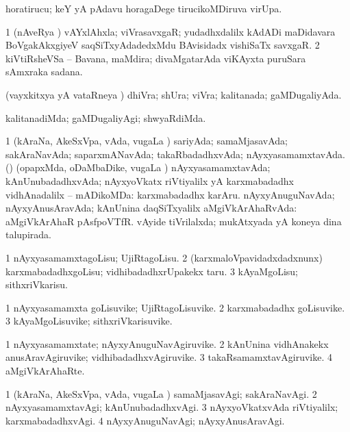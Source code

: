 \bentry
{} 
\gl{\nA}
\expl{}
\bmng
 horatirucu; keY yA pAdavu horagaDege tirucikoMDiruva virUpa. 
\emng
\eentry

\bentry
{} 
\gl{\nA}
\expl{}
\bmng
\bnum
\num{1} (nAveRya \pu) vAYxlAhxla; viVrasavxgaR; yudadhxdalilx kAdADi maDidavara BoVgakAkxgiyeV saqSiTxyAdadedxMdu BAvisidadx vishiSaTx savxgaR. 
\num{2} kiVtiRsheVSa -- Bavana, maMdira; divaMgatarAda viKAyxta puruSara sAmxraka sadana. 
\enum
\emng
\eentry

\bentry
{} 
\gl{\gu}
\expl{}
\bmng
 (vayxkitxya yA vataRneya \vi) dhiVra; shUra; viVra; kalitanada; gaMDugaliyAda. 
\emng
\eentry

\bentry
{} 
\gl{\kirxvi}
\expl{}
\bmng
 kalitanadiMda; gaMDugaliyAgi; shwyaRdiMda. 
\emng
\eentry

\bentry
{} 
\gl{\gu}
\expl{}
\bmng
\bnum
\num{1} (kAraNa, AkeSxVpa, vAda, \mo vugaLa \vi) sariyAda; samaMjasavAda; sakAraNavAda; saparxmANavAda; takaRbadadhxvAda; nAyxyasamamxtavAda. 
 (\nAyxshA) (opapxMda, oDaMbaDike, \mo vugaLa \vi) nAyxyasamamxtavAda; kAnUnubadadhxvAda; nAyxyoVkatx riVtiyalilx yA karxmabadadhx vidhAnadalilx -- mADikoMDa: 
\banum
{}  karxmabadadhx karAru. 
 nAyxyAnuguNavAda; nAyxyAnusAravAda; kAnUnina daqSiTxyalilx aMgiVkArAhaRvAda:  aMgiVkArAhaR pAsfpoVTfR. 
 vAyide tiVrilalxda; mukAtxyada yA koneya dina talupirada. 
\eanum
\numie
\enum
\emng
\eentry

\bentry
{} 
\gl{\sakirx}
\expl{}
\bmng
\bnum
\num{1} nAyxyasamamxtagoLisu; UjiRtagoLisu. 
\num{2} (karxmaloVpavidadxdadxnunx) karxmabadadhxgoLisu; vidhibadadhxrUpakekx taru. 
\num{3} kAyaMgoLisu; sithxriVkarisu. 
\enum
\emng
\eentry

\bentry
{} 
\gl{\nA}
\expl{}
\bmng
\bnum
\num{1} nAyxyasamamxta goLisuvike; UjiRtagoLisuvike. 
\num{2} karxmabadadhx goLisuvike. 
\num{3} kAyaMgoLisuvike; sithxriVkarisuvike. 
\enum
\emng
\eentry

\bentry
{} 
\gl{\nA}
\expl{}
\bmng
\bnum
\num{1} nAyxyasamamxtate; nAyxyAnuguNavAgiruvike. 
\num{2} kAnUnina vidhAnakekx anusAravAgiruvike; vidhibadadhxvAgiruvike. 
\num{3} takaRsamamxtavAgiruvike. 
\num{4} aMgiVkArAhaRte. 
\enum
\emng
\eentry

\bentry
{} 
\gl{\kirxvi}
\expl{}
\bmng
\bnum
\num{1} (kAraNa, AkeSxVpa, vAda, \mo vugaLa \vi) samaMjasavAgi; sakAraNavAgi. 
\num{2} nAyxyasamamxtavAgi; kAnUnubadadhxvAgi. 
\num{3} nAyxyoVkatxvAda riVtiyalilx; karxmabadadhxvAgi. 
\num{4} nAyxyAnuguNavAgi; nAyxyAnusAravAgi. 
\enum
\emng
\eentry

